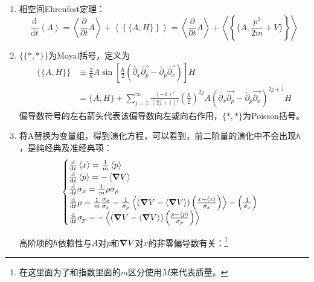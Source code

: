 \documentclass[12pt,a4paper,openany,twoside]{book}
\numberwithin{equation}{section}
\newcommand{\mean}[1]{\left\langle #1 \right\rangle}
\newcommand{\ud}{\mathrm{d}}
\begin{document}
        \begin{enumerate}
          \item 相空间Ehrenfest定理：
            \begin{equation}
              \frac{\ud}{\ud t}\mean{A}=\mean{\frac{\partial}{\partial t} A}+\mean{\left\{\{A,H\}\right\}}
              =\mean{\frac{\partial}{\partial t} A}+\mean{\left\{\{A,\frac{p^2}{2 m}+V\}\right\}}
            \end{equation}

          \item $\{\{*,*\}\}$为Moyal括号，定义为
            \begin{align}
              \{\{A,H\}\}&\equiv \frac{2}{\hbar}A \sin \left[\frac{\hbar}{2} (\overleftarrow{\partial_x}\overrightarrow{\partial_p}-\overleftarrow{\partial_p}\overrightarrow{\partial_x})\right]H\\
              &=\{A,H\}+\sum^\infty_{j=1}\frac{(-1)^j}{(2j+1)!}\left(\frac{\hbar}{2}\right)^{2j}A(\overleftarrow{\partial_x}\overrightarrow{\partial_p}-\overleftarrow{\partial_p}\overrightarrow{\partial_x})^{2j+1} H
            \end{align}
            偏导数符号的左右箭头代表该偏导数向左或向右作用，$\{*,*\}$为Poisson括号。

          \item 将A替换为变量组，得到演化方程，可以看到，前二阶量的演化中不会出现$\hbar$，是纯经典及准经典项：
            \begin{equation}
              \begin{cases}
              \frac{\ud}{\ud t}\mean{x}=\frac{1}{m}\mean{p}\\
              \frac{\ud}{\ud t}\mean{p}=-\mean{\grad V}\\
              \frac{\ud}{\ud t}\sigma_x = \frac{1}{m}\rho \sigma_p\\
              \frac{\ud}{\ud t} \rho = \frac{1}{m}\frac{\sigma_p}{\sigma_x} - \frac{1}{\sigma_p} \mean{(\grad V- \mean{\grad V })\left(\frac{x-\mean{x}}{\sigma_x}\right)}-\left(\frac{1}{\sigma_x}\right)\\
              \frac{\ud}{\ud t}\sigma_p=- \mean{(\grad V-\mean{\grad V })\left(\frac{p-\mean{p}}{\sigma_p}\right)}
              \end{cases}
            \end{equation}

            高阶项的$\hbar$依赖性与$A$对$p$和$\grad V$对$x$的非零偏导数有关：\footnote{在这里面为了和指数里面的$m$区分使用$M$来代表质量。}
        \end{enumerate}
\end{document}
